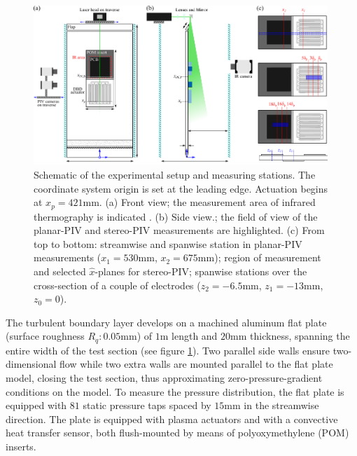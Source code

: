 \begin{figure}[t]
    \centering
    \includegraphics[width = 0.99\textwidth]{figures/methodology/setup_all_rebut.pdf}
    \caption{Schematic of the experimental setup and measuring stations. The coordinate system origin is set at the leading edge. Actuation begins at $x_p = 421\mathrm{mm}$. (a) Front view; the measurement area of infrared thermography is indicated . (b) Side view.; the field of view of the planar-PIV  and stereo-PIV  measurements are highlighted. (c) From top to bottom: streamwise  and spanwise  station in planar-PIV measurements ($x_1=530\mathrm{mm}$, $x_2=675\mathrm{mm}$); region of measurement  and selected $\hat{x}$-planes  for stereo-PIV; spanwise stations  over the cross-section of a couple of electrodes ($z_2=-6.5\mathrm{mm}$, $z_1=-13\mathrm{mm}$, $z_0=0$).}
    \label{fig:setup}
\end{figure}

The turbulent boundary layer develops on a machined aluminum flat plate  (surface roughness $R_q: 0.05\mathrm{mm}$) of $1\mathrm{m}$ length and $20\mathrm{mm}$ thickness, spanning the entire width of the test section (see figure \ref{fig:setup}). Two parallel side walls ensure two-dimensional flow while two extra walls are mounted parallel to the flat plate model, closing the test section, thus approximating zero-pressure-gradient conditions on the model. To measure the pressure distribution, the flat plate is equipped with $81$ static pressure taps spaced by $15\mathrm{mm}$ in the streamwise direction. The plate is equipped with plasma actuators and with a convective heat transfer sensor, both flush-mounted by means of polyoxymethylene (POM) inserts.

